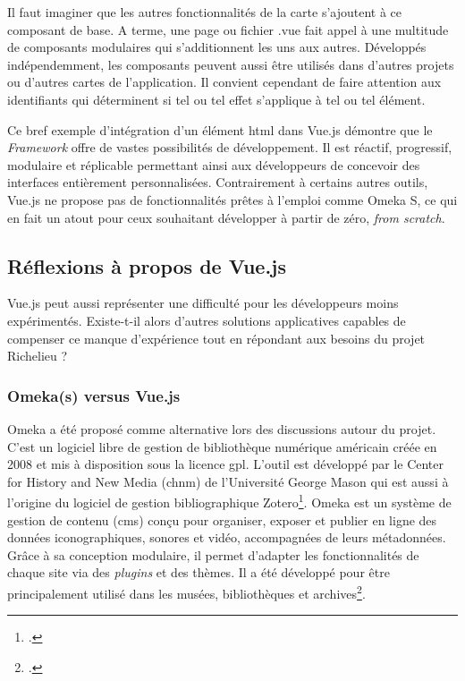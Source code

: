 Il faut imaginer que les autres fonctionnalités de la carte s'ajoutent à ce composant de base. A terme, une page ou fichier .vue fait appel à une multitude de composants modulaires qui s'additionnent les uns aux autres. Développés indépendemment, les composants peuvent aussi être utilisés dans d'autres projets ou d'autres cartes de l'application. Il convient cependant de faire attention aux identifiants qui déterminent si tel ou tel effet s'applique à tel ou tel élément. 

Ce bref exemple d'intégration d'un élément  \acrshort{html} dans Vue.js démontre que le \textit{Framework} offre de vastes possibilités de développement. Il est réactif, progressif, modulaire et réplicable permettant ainsi aux développeurs de concevoir des interfaces entièrement personnalisées. Contrairement à certains autres outils, Vue.js ne propose pas de fonctionnalités prêtes à l'emploi comme Omeka S, ce qui en fait un atout pour ceux souhaitant développer à partir de zéro, \textit{from scratch}. 

\subsection{Réflexions à propos de Vue.js}

Vue.js peut aussi représenter une difficulté pour les développeurs moins expérimentés. Existe-t-il alors d'autres solutions applicatives capables de compenser ce manque d'expérience tout en répondant aux besoins du projet Richelieu ? 

\subsubsection{Omeka(s) versus Vue.js}
Omeka a été proposé comme alternative lors des discussions autour du projet. C'est un logiciel libre de gestion de bibliothèque numérique américain créée en 2008 et mis à disposition sous la licence \acrshort{gpl}. L'outil est développé par le Center for History and New Media (\acrshort{chnm}) de l'Université George Mason qui est aussi à l'origine du logiciel de gestion bibliographique Zotero\footcite{OMEKAAssociation}. Omeka est un système de gestion de contenu (\acrshort{cms}) conçu pour organiser, exposer et publier en ligne des données iconographiques, sonores et vidéo, accompagnées de leurs métadonnées. Grâce à sa conception modulaire, il permet d'adapter les fonctionnalités de chaque site via des \textit{plugins} et des thèmes. Il a été développé pour être principalement utilisé dans les musées, bibliothèques et archives\footcite{bibliotheque2019}.

